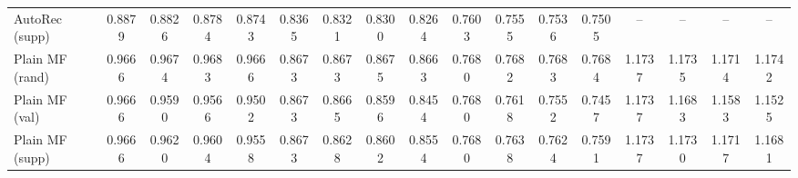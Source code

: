 \begin{table}[htbp]
{\begin{tabular}{lcccccccccccccccc}
AutoRec (supp) & 0.8879 & 0.8826 & 0.8784 & 0.8743 & 0.8365 & 0.8321 & 0.8300 & 0.8264 & 0.7603 & 0.7555 & 0.7536 & 0.7505 & -- & -- & -- & -- \\
\addlinespace
Plain MF (rand) & 0.9666 & 0.9674 & 0.9683 & 0.9666 & 0.8673 & 0.8673 & 0.8675 & 0.8663 & 0.7680 & 0.7682 & 0.7683 & 0.7684 & 1.1737 & 1.1735 & 1.1714 & 1.1742 \\
Plain MF (val) & 0.9666 & 0.9590 & 0.9566 & 0.9502 & 0.8673 & 0.8665 & 0.8596 & 0.8454 & 0.7680 & 0.7618 & 0.7552 & 0.7457 & 1.1737 & 1.1683 & 1.1583 & 1.1525 \\
Plain MF (supp) & 0.9666 & 0.9620 & 0.9604 & 0.9558 & 0.8673 & 0.8628 & 0.8602 & 0.8554 & 0.7680 & 0.7638 & 0.7624 & 0.7591 & 1.1737 & 1.1730 & 1.1717 & 1.1681 \\
\bottomrule
\end{tabular}%
}
\end{table}